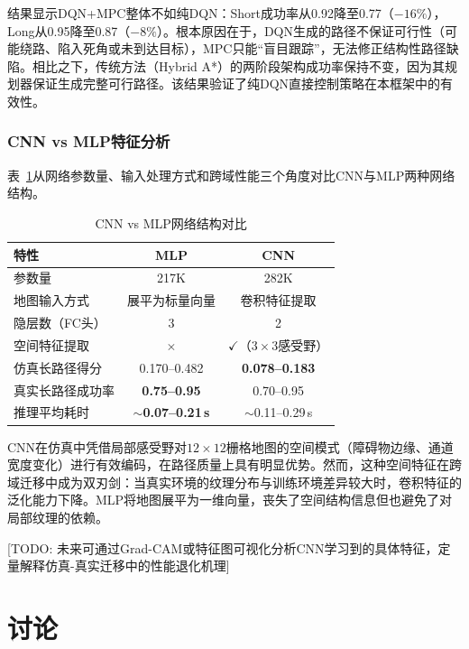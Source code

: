 \documentclass[twocolumn]{elsarticle}
\begin{document}
结果显示DQN+MPC整体不如纯DQN：Short成功率从0.92降至0.77（$-16\%$），Long从0.95降至0.87（$-8\%$）。根本原因在于，DQN生成的路径不保证可行性（可能绕路、陷入死角或未到达目标），MPC只能``盲目跟踪''，无法修正结构性路径缺陷。相比之下，传统方法（Hybrid A*）的两阶段架构成功率保持不变，因为其规划器保证生成完整可行路径。该结果验证了纯DQN直接控制策略在本框架中的有效性。

\subsubsection{CNN vs MLP特征分析}

表~\ref{tab:cnn_vs_mlp}从网络参数量、输入处理方式和跨域性能三个角度对比CNN与MLP两种网络结构。

\begin{table}[t]
\centering
\caption{CNN vs MLP网络结构对比}
\label{tab:cnn_vs_mlp}
\footnotesize
\begin{tabular}{@{}lcc@{}}
\toprule
\textbf{特性} & \textbf{MLP} & \textbf{CNN} \\
\midrule
参数量 & 217K & 282K \\
地图输入方式 & 展平为标量向量 & 卷积特征提取 \\
隐层数（FC头） & 3 & 2 \\
空间特征提取 & $\times$ & $\checkmark$（$3\times3$感受野） \\
仿真长路径得分 & 0.170--0.482 & \textbf{0.078--0.183} \\
真实长路径成功率 & \textbf{0.75--0.95} & 0.70--0.95 \\
推理平均耗时 & \textbf{$\sim$0.07--0.21\,s} & $\sim$0.11--0.29\,s \\
\bottomrule
\end{tabular}
\end{table}

CNN在仿真中凭借局部感受野对$12\times12$栅格地图的空间模式（障碍物边缘、通道宽度变化）进行有效编码，在路径质量上具有明显优势。然而，这种空间特征在跨域迁移中成为双刃剑：当真实环境的纹理分布与训练环境差异较大时，卷积特征的泛化能力下降。MLP将地图展平为一维向量，丧失了空间结构信息但也避免了对局部纹理的依赖。

[TODO: 未来可通过Grad-CAM或特征图可视化分析CNN学习到的具体特征，定量解释仿真-真实迁移中的性能退化机理]

\section{讨论}\label{sec:discussion}
\end{document}
